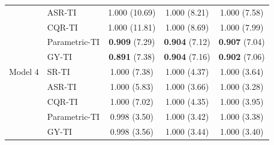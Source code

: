 \begin{table}[!h]
\begin{tabular}[t]{llccc}
\hspace{1em} & ASR-TI & 1.000 (10.69) & 1.000 (8.21) & 1.000 (7.58)\\
\hspace{1em} & CQR-TI & 1.000 (11.81) & 1.000 (8.69) & 1.000 (7.99)\\
\hspace{1em} & Parametric-TI & \textbf{0.909} (7.29) & \textbf{0.904} (7.12) & \textbf{0.907} (7.04)\\
\hspace{1em} & GY-TI & \textbf{0.891} (7.38) & \textbf{0.904} (7.16) & \textbf{0.902} (7.06)\\
\hspace{1em}Model 4 & SR-TI & 1.000 (7.38) & 1.000 (4.37) & 1.000 (3.64)\\
\hspace{1em} & ASR-TI & 1.000 (5.83) & 1.000 (3.66) & 1.000 (3.28)\\
\hspace{1em} & CQR-TI & 1.000 (7.02) & 1.000 (4.35) & 1.000 (3.95)\\
\hspace{1em} & Parametric-TI & 0.998 (3.50) & 1.000 (3.42) & 1.000 (3.38)\\
\hspace{1em} & GY-TI & 0.998 (3.56) & 1.000 (3.44) & 1.000 (3.40)\\
\bottomrule
\end{tabular}
\end{table}
